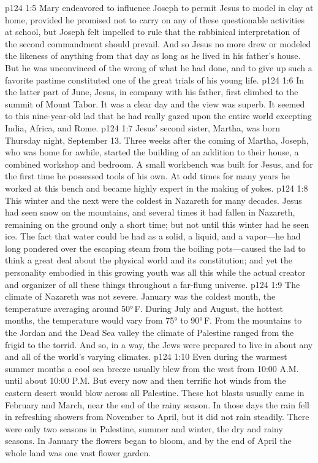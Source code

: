 \vs p124 1:5 Mary endeavored to influence Joseph to permit Jesus to model in clay at home, provided he promised not to carry on any of these questionable activities at school, but Joseph felt impelled to rule that the rabbinical interpretation of the second commandment should prevail. And so Jesus no more drew or modeled the likeness of anything from that day as long as he lived in his father’s house. But he was unconvinced of the wrong of what he had done, and to give up such a favorite pastime constituted one of the great trials of his young life.
\pc \vs p124 1:6 In the latter part of June, Jesus, in company with his father, first climbed to the summit of Mount Tabor. It was a clear day and the view was superb. It seemed to this nine\hyp{}year\hyp{}old lad that he had really gazed upon the entire world excepting India, Africa, and Rome.
\pc \vs p124 1:7 Jesus’ second sister, Martha, was born Thursday night, September 13. Three weeks after the coming of Martha, Joseph, who was home for awhile, started the building of an addition to their house, a combined workshop and bedroom. A small workbench was built for Jesus, and for the first time he possessed tools of his own. At odd times for many years he worked at this bench and became highly expert in the making of yokes.
\pc \vs p124 1:8 This winter and the next were the coldest in Nazareth for many decades. Jesus had seen snow on the mountains, and several times it had fallen in Nazareth, remaining on the ground only a short time; but not until this winter had he seen ice. The fact that water could be had as a solid, a liquid, and a vapor---he had long pondered over the escaping steam from the boiling pots---caused the lad to think a great deal about the physical world and its constitution; and yet the personality embodied in this growing youth was all this while the actual creator and organizer of all these things throughout a far\hyp{}flung universe.
\vs p124 1:9 The climate of Nazareth was not severe. January was the coldest month, the temperature averaging around 50°\,F. During July and August, the hottest months, the temperature would vary from 75° to 90°\,F. From the mountains to the Jordan and the Dead Sea valley the climate of Palestine ranged from the frigid to the torrid. And so, in a way, the Jews were prepared to live in about any and all of the world’s varying climates.
\vs p124 1:10 Even during the warmest summer months a cool sea breeze usually blew from the west from 10:00 A.M. until about 10:00 P.M. But every now and then terrific hot winds from the eastern desert would blow across all Palestine. These hot blasts usually came in February and March, near the end of the rainy season. In those days the rain fell in refreshing showers from November to April, but it did not rain steadily. There were only two seasons in Palestine, summer and winter, the dry and rainy seasons. In January the flowers began to bloom, and by the end of April the whole land was one vast flower garden.

